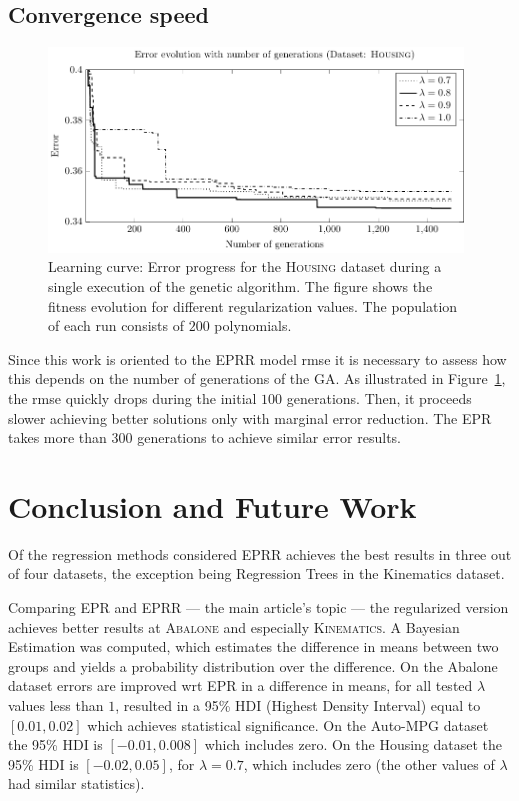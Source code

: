 \documentclass[review,preprint]{elsarticle}
\begin{document}
\subsection{Convergence speed}
%
\begin{figure}[tb]
	\begin{center}
		\includegraphics[width=0.98\textwidth]{Fig4.pdf}
		\caption{Learning curve: Error progress for the \textsc{Housing} dataset during a single execution of the genetic algorithm. The figure shows the fitness evolution for different regularization values. The population of each run consists of $200$ polynomials.}
		\label{Abalone_fitnessProgress}
	\end{center}
\end{figure}
%
Since this work is oriented to the \ac{EPRR} model \ac{rmse} it is necessary to assess how this depends on the number of generations of the \ac{GA}. As illustrated in Figure~\ref{Abalone_fitnessProgress}, the \ac{rmse} quickly drops during the initial $100$ generations. Then, it proceeds slower achieving better solutions only with marginal error reduction. The \ac{EPR} takes more than $300$ generations to achieve similar error results.

\section{Conclusion and Future Work}

Of the regression methods considered \ac{EPRR} achieves the best results in three out of four datasets, the exception being Regression Trees in the Kinematics dataset. 

Comparing \ac{EPR} and \ac{EPRR} --- the main article's topic --- the regularized version achieves better results at \textsc{Abalone} and especially \textsc{Kinematics}. A Bayesian Estimation was computed, which estimates the difference in means between two groups and yields a probability distribution over the difference. On the Abalone dataset errors are improved wrt EPR in a difference in means, for all tested $\lambda$ values less than $1$, resulted in a 95\% HDI (Highest Density Interval) equal to $\left\lbrack 0.01, 0.02 \right\rbrack$ which achieves statistical significance. On the Auto-MPG dataset the 95\% HDI is $\left\lbrack -0.01, 0.008 \right\rbrack$ which includes zero. On the Housing dataset the 95\% HDI is $\left\lbrack- 0.02, 0.05 \right\rbrack$, for $\lambda = 0.7$, which includes zero (the other values of $\lambda$ had similar statistics).
\end{document}
